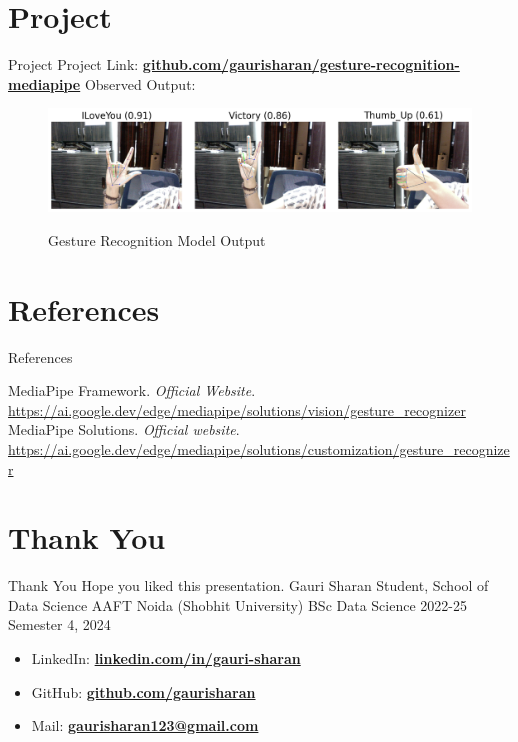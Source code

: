 \documentclass[aspectratio=169, hideothersubsections]{beamer}
\begin{document}
\section{Project}
\begin{frame}{Project}
  Project Link: \href{https://github.com/gaurisharan/gesture-recognition-mediapipe}{\bf github.com/gaurisharan/gesture-recognition-mediapipe} 
  Observed Output:
\begin{figure}
  \centering
  \includegraphics[width=\textwidth]{output.png}
  \label{fig:example}
  \caption{Gesture Recognition Model Output}
\end{figure}
\end{frame}

\section{References}
\begin{frame}{References}
  \begin{thebibliography}{10}
    \beamertemplatebookbibitems
    MediaPipe Framework. \textit{Official Website}. \url{https://ai.google.dev/edge/mediapipe/solutions/vision/gesture_recognizer}
    \beamertemplatebookbibitems
     MediaPipe Solutions. \textit{Official website}. \url{https://ai.google.dev/edge/mediapipe/solutions/customization/gesture_recognizer}
  \end{thebibliography}
\end{frame}

\section{Thank You}
\begin{frame}{Thank You}
Hope you liked this presentation. \newline \newline
\alert{Gauri Sharan} \newline
Student, School of Data Science \newline
AAFT Noida (Shobhit University) \newline
BSc Data Science 2022-25 \newline
Semester 4, 2024 \newline
\begin{itemize}
    \item LinkedIn: \href{https://www.linkedin.com/in/gauri-sharan}{\bf linkedin.com/in/gauri-sharan} 
    \item GitHub: \href{https://github.com/gaurisharan}{\bf github.com/gaurisharan}
    \item Mail: \href{mailto:gaurisharan123@gmail.com}{\bf gaurisharan123@gmail.com}
\end{itemize}
\end{frame}
\end{document}
